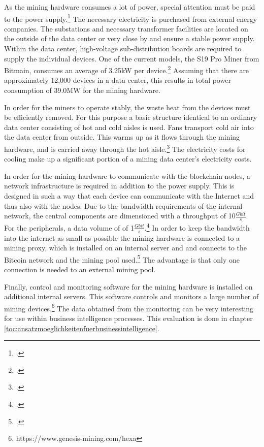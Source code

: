 As the mining hardware consumes a lot of power, special attention must be paid to the power supply.\footcite[Cf.][p. 327]{derks2018chaining}
The necessary electricity is purchased from external energy companies. The
substations and necessary transformer facilities are located on the outside of the data center or very close by
and ensure a stable power supply. Within the data center, high-voltage sub-distribution boards are
required to supply the individual devices. One of the current models,
the S19 Pro Miner from Bitmain, consumes an average of 3.25kW per device.\footcite[Cf.][]{s19pro2021consumption}
Assuming that there are approximately 12,000 devices in a data center, this results in total
power consumption of 39.0MW for the mining hardware.

In order for the miners to operate stably, the waste heat from the devices must be efficiently removed. For this purpose
a basic structure identical to an ordinary data center consisting of hot and cold aisles is used.
Fans transport cold air into the data center from outside. This warms up as it flows through the
mining hardware, and is carried away through the hot aisle.\footcite[Cf.][]{appendix:layoutkardok} The
electricity costs for cooling make up a significant portion of a mining data center's electricity costs.

In order for the mining hardware to communicate with the blockchain nodes, a network infrastructure is required in addition to the power supply.
This is designed in such a way that each device can communicate with the Internet and thus also with the nodes.
Due to the bandwidth requirements of the internal network, the central
components are dimensioned with a throughput of 10$\frac{Gbit}{s}$. For the peripherals, a data volume of
of 1$\frac{Gbit}{s}$.\footcite[Cf.][]{appendix:networktopology} In order to keep the bandwidth into the internet as small as possible
the mining hardware is connected to a mining proxy, which is installed on an internal server and
and connects to the Bitcoin network and the mining pool used.\footcite[Cf.][]{appendix:miningproxy}
The advantage is that only one connection is needed to an external mining pool.

Finally, control and monitoring software for the mining hardware is installed on additional internal servers.
This software controls and monitors a large number of mining devices.\footnote{https://www.genesis-mining.com/hexa}
The data obtained from the monitoring can be very
interesting for use within business intelligence processes. This evaluation is done
in chapter \ref{toc:ansatzmoeglichkeitenfuerbusinessintelligence}.

